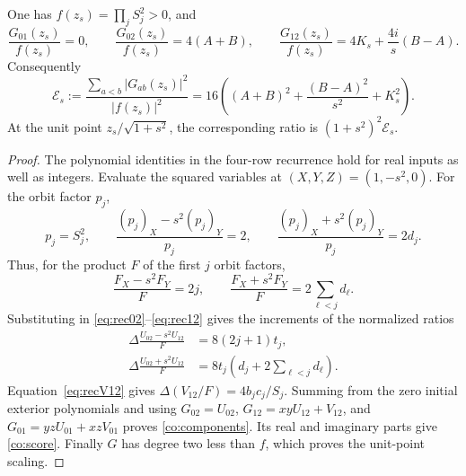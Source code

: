 \begin{proposition}\label{co:evaluation}
One has \(f(z_s)=\prod_jS_j^2>0\), and
\begin{equation}\label{co:components}
 \frac{G_{01}(z_s)}{f(z_s)}=0,\qquad
 \frac{G_{02}(z_s)}{f(z_s)}=4(A+B),\qquad
 \frac{G_{12}(z_s)}{f(z_s)}=4K_s+\frac{4i}{s}(B-A).
\end{equation}
Consequently
\begin{equation}\label{co:score}
 \mathcal E_s:=
 \frac{\sum_{a<b}|G_{ab}(z_s)|^2}{|f(z_s)|^2}
 =16\left((A+B)^2+\frac{(B-A)^2}{s^2}+K_s^2\right).
\end{equation}
At the unit point \(z_s/\sqrt{1+s^2}\), the corresponding ratio is
\((1+s^2)^2\mathcal E_s\).
\end{proposition}
\begin{proof}
The polynomial identities in the four-row recurrence hold for real
inputs as well as integers. Evaluate the squared variables at
\((X,Y,Z)=(1,-s^2,0)\). For the orbit factor \(p_j\),
\[
 p_j=S_j^2,\qquad
 \frac{(p_j)_X-s^2(p_j)_Y}{p_j}=2,\qquad
 \frac{(p_j)_X+s^2(p_j)_Y}{p_j}=2d_j.
\]
Thus, for the product \(F\) of the first \(j\) orbit factors,
\[
 \frac{F_X-s^2F_Y}{F}=2j,\qquad
 \frac{F_X+s^2F_Y}{F}=2\sum_{\ell<j}d_\ell.
\]
Substituting in \eqref{eq:rec02}--\eqref{eq:rec12} gives the
increments of the normalized ratios
\begin{align*}
 \Delta\frac{U_{02}-s^2U_{12}}F&=8(2j+1)t_j,\\
 \Delta\frac{U_{02}+s^2U_{12}}F
 &=8t_j\left(d_j+2\sum_{\ell<j}d_\ell\right).
\end{align*}
Equation~\eqref{eq:recV12} gives
\(\Delta(V_{12}/F)=4b_jc_j/S_j\).
Summing from the zero initial exterior polynomials and using
\(G_{02}=U_{02}\), \(G_{12}=xyU_{12}+V_{12}\), and
\(G_{01}=yzU_{01}+xzV_{01}\) proves \eqref{co:components}.
Its real and imaginary parts give \eqref{co:score}. Finally \(G\)
has degree two less than \(f\), which proves the unit-point scaling.
\end{proof}

